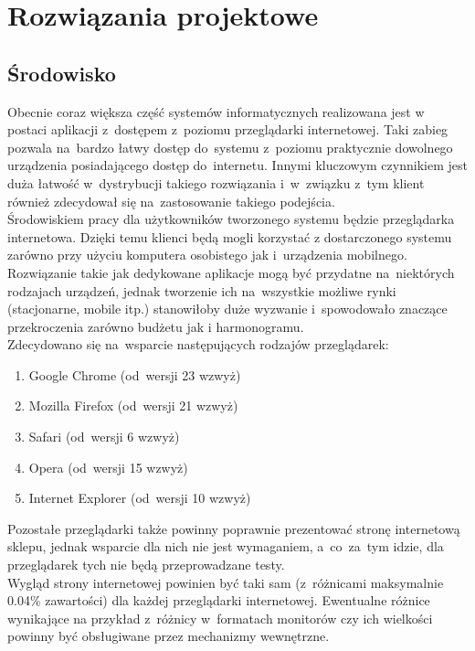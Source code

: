 \section{Rozwiązania projektowe}

\subsection {Środowisko}
Obecnie coraz większa część systemów informatycznych realizowana jest w postaci aplikacji z~dostępem z~poziomu przeglądarki internetowej. Taki zabieg pozwala na~bardzo łatwy dostęp do~systemu z~poziomu praktycznie dowolnego urządzenia posiadającego dostęp do~internetu. Innymi kluczowym czynnikiem jest duża łatwość w~dystrybucji takiego rozwiązania i~w~związku z~tym klient również zdecydował się na~zastosowanie takiego podejścia.\\

Środowiskiem pracy dla użytkowników tworzonego systemu będzie przeglądarka internetowa. Dzięki temu klienci będą mogli korzystać z dostarczonego systemu zarówno przy użyciu komputera osobistego jak i~urządzenia mobilnego. Rozwiązanie takie jak dedykowane aplikacje mogą być przydatne na~niektórych rodzajach urządzeń, jednak tworzenie ich na~wszystkie możliwe rynki (stacjonarne, mobile itp.) stanowiłoby duże wyzwanie i~spowodowało znaczące przekroczenia zarówno budżetu jak i harmonogramu.\\

Zdecydowano się na~wsparcie następujących rodzajów przeglądarek:
\begin{enumerate}
  \item Google Chrome (od~wersji 23 wzwyż)
  \item Mozilla Firefox (od~wersji 21 wzwyż)
  \item Safari (od~wersji 6 wzwyż)
  \item Opera (od~wersji 15 wzwyż)
  \item Internet Explorer (od~wersji 10 wzwyż)
\end{enumerate}

Pozostałe przeglądarki także powinny poprawnie prezentować stronę internetową sklepu, jednak wsparcie dla nich nie jest wymaganiem, a~co~za~tym idzie, dla przeglądarek tych nie będą przeprowadzane testy.\\

Wygląd strony internetowej powinien być taki sam (z~różnicami maksymalnie 0.04\% zawartości) dla każdej przeglądarki internetowej. Ewentualne różnice wynikające na przykład z~różnicy w~formatach monitorów czy ich wielkości powinny być obsługiwane przez mechanizmy wewnętrzne.\\

